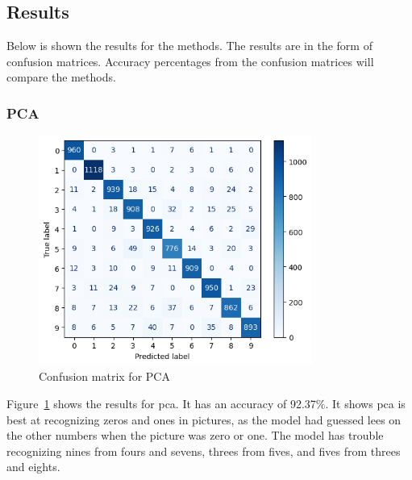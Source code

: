 

\subsection{Results}\label{subsec:experiment-3-results}
Below is shown the results for the methods. The results are in the form of confusion matrices. Accuracy percentages from the confusion matrices will compare the methods.  

\subsubsection{PCA}
\begin{figure}[htb!]
    \centering
    \includegraphics[width=0.8\textwidth]{figures/experiment-3/confusion_matrix_pca_svm.png}
    \caption{Confusion matrix for PCA}
    \label{fig:confusion-matrix-pca-svm}
\end{figure}
Figure~\ref{fig:confusion-matrix-pca-svm} shows the results for \gls{pca}. It has an accuracy of 92.37\%. It shows \gls{pca} is best at recognizing zeros and ones in pictures, as the model had guessed lees on the other numbers when the picture was zero or one. The model has trouble recognizing nines from fours and sevens, threes from fives, and fives from threes and eights.  


